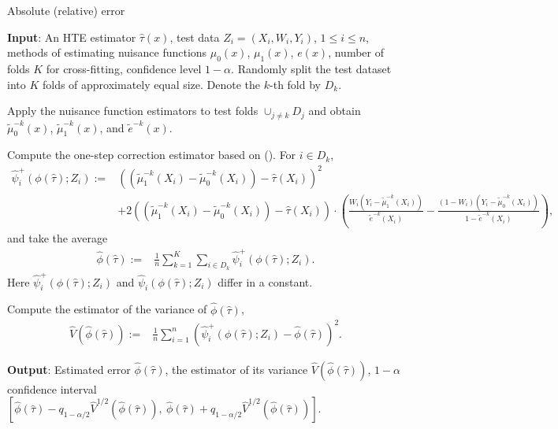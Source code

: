 \documentclass{article}
\theoremstyle{plain}
\theoremstyle{definition}
\theoremstyle{plain}
\begin{document}
\begin{algorithm}\caption{Absolute (relative) error}\label{algo:absolute.error}
    \begin{algorithmic}[1]
    \STATE \textbf{Input}: An HTE estimator $\hat{\tau}(x)$, test data $Z_i = (X_i, W_i, Y_i)$, $1 \le i \le n$, methods of estimating nuisance functions $\mu_0(x)$, $\mu_1(x)$, $e(x)$, number of folds $K$ for cross-fitting, confidence level $1-\alpha$.
    \STATE Randomly split the test dataset into $K$ folds of approximately equal size. Denote the $k$-th fold by $D_k$.

    
    \STATE Apply the nuisance function estimators to test folds $\cup_{j \neq k} D_j$ and obtain $\tilde{\mu}_{0}^{-k}(x)$, $\tilde{\mu}_{1}^{-k}(x)$, and $\tilde{e}^{-k}(x)$.

    \ENDFOR
    
    \STATE Compute the one-step correction estimator based on  (). 
    For $i \in D_k$,
    \begin{align*} 
        \hat{\psi}_i^+(\phi(\hat{\tau}); Z_i) :=& \left((\tilde{\mu}_1^{-k}(X_i) - \tilde{\mu}_0^{-k}(X_i)) - \hat{\tau}(X_i)\right)^2 \\
        &+ 2\left((\tilde{\mu}_1^{-k}(X_i) - \tilde{\mu}_0^{-k}(X_i)) - \hat{\tau}(X_i)\right) \cdot \left(\frac{W_i(Y_i - \tilde{\mu}_1^{-k}(X_i))}{\tilde{e}^{-k}(X_i)} - \frac{(1-W_i)(Y_i - \tilde{\mu}_0^{-k}(X_i))}{1-\tilde{e}^{-k}(X_i)} \right),
    \end{align*}
     and take the average
     \begin{align*}
        \hat{\phi}(\hat{\tau}) :=& \frac{1}{n} \sum_{k=1}^K \sum_{i \in D_k} \hat{\psi}_i^+(\phi(\hat{\tau}); Z_i).
    \end{align*}
    Here $\hat{\psi}_i^+(\phi(\hat{\tau}); Z_i) $ and $\hat{\psi}_i(\phi(\hat{\tau}); Z_i)$ differ in a constant.
    
    \STATE Compute the estimator of the variance of $\hat{\phi}(\hat{\tau})$,
    \begin{align*}
       \hat{V}(\hat{\phi}(\hat{\tau})) :=& \frac{1}{n} \sum_{i = 1}^n \left(\hat{\psi}_i^+(\phi(\hat{\tau}); Z_i)  -  \hat{\phi}(\hat{\tau}) \right)^2.
    \end{align*}
    
    \STATE \textbf{Output}: Estimated error $\hat{\phi}(\hat{\tau})$, the estimator of its variance $\hat{V}(\hat{\phi}(\hat{\tau}))$, $1-\alpha$ confidence interval $\left[\hat{\phi}(\hat{\tau}) - q_{1-\alpha/2} \hat{V}^{1/2}(\hat{\phi}(\hat{\tau})), ~\hat{\phi}(\hat{\tau}) + q_{1-\alpha/2} \hat{V}^{1/2}(\hat{\phi}(\hat{\tau}))\right]$.

    \end{algorithmic}
\end{algorithm}
\end{document}
